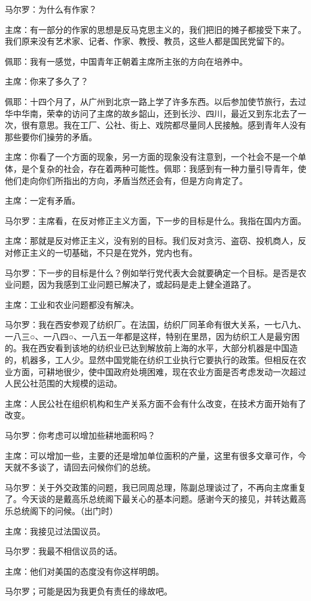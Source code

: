 马尔罗：为什么有作家？

主席：有一部分的作家的思想是反马克思主义的，我们把旧的摊子都接受下来了。我们原来没有艺术家、记者、作家、教授、教员，这些人都是国民党留下的。

佩耶：我有一感觉，中国青年正朝着主席所主张的方向在培养中。

主席：你来了多久了？

佩耶：十四个月了，从广州到北京一路上学了许多东西。以后参加使节旅行，去过华中华南，荣幸的访问了主席的故乡韶山，还到长沙、四川，最近又到东北去了一次，很有意思。我在工厂、公社、街上、戏院都尽量同人民接触。感到青年人没有那些要你们操劳的矛盾。

主席：你看了一个方面的现象，另一方面的现象没有注意到，一个社会不是一个单体，是个复杂的社会，存在着两种可能性。佩耶：我感到有一种力量引导青年，使他们走向你们所指出的方向，矛盾当然还会有，但是方向肯定了。

主席：一定有矛盾。

马尔罗：主席看，在反对修正主义方面，下一步的目标是什么。我指在国内方面。

主席：那就是反对修正主义，没有别的目标。我们反对贪污、盗窃、投机商人，反对修正主义的一切基础，不只是在党外，党内也有。

马尔罗：下一步的目标是什么？例如举行党代表大会就要确定一个目标。是否是农业问题，因为我感到工业问题已解决了，或起码是走上健全道路了。

主席：工业和农业问题都没有解决。

马尔罗：我在西安参观了纺织厂。在法国，纺织厂同革命有很大关系，一七八九、一八三○、一八四○、一八五一年都是这样，特别在里昂，因为纺织工人是最穷困的。我在西安看到该地的纺织业已达到解放前上海的水平，大部分机器是中国造的，机器多，工人少。显然中国党能在纺织工业执行它要执行的政策。但相反在农业方面，可耕地很少，使中国政府处境困难，现在农业方面是否考虑发动一次超过人民公社范围的大规模的运动。

主席：人民公社在组织机构和生产关系方面不会有什么改变，在技术方面开始有了改变。

马尔罗：你考虑可以增加些耕地面积吗？

主席：可以增加一些，主要的还是增加单位面积的产量，这里有很多文章可作，今天就不多谈了，请回去问候你们的总统。

马尔罗：关于外交政策的问题，我已同周总理，陈副总理谈过了，不再向主席重复了。今天谈的是戴高乐总统阁下最关心的基本问题。感谢今天的接见，并转达戴高乐总统阁下的问候。（出门时）

主席：我接见过法国议员。

马尔罗：我最不相信议员的话。

主席：他们对美国的态度没有你这样明朗。

马尔罗；可能是因为我更负有责任的缘故吧。


